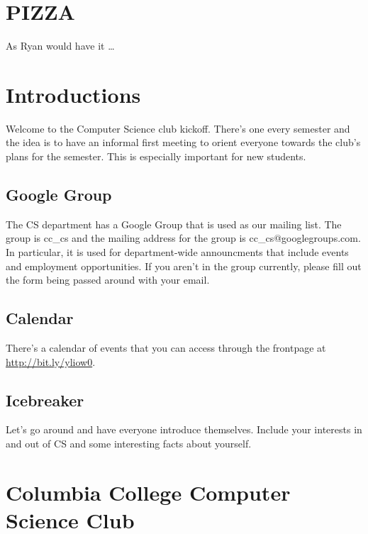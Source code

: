 

\renewcommand\TITLE{CCCS: Spring 2016 Agenda}


\topmatter


\section{PIZZA}
\label{sec-1}

As Ryan would have it \ldots{}


\newpage


\section{Introductions}
\label{sec-2}

Welcome to the Computer Science club kickoff. There's one every semester
and the idea is to have an informal first meeting to orient everyone towards
the club's plans for the semester. This is especially important for new
students.

\subsection{Google Group}
\label{sec-2-1}

The CS department has a Google Group that is used as our mailing list. The
group is cc\_cs and the mailing address for the group is cc\_cs@googlegroups.com.
In particular, it is used for department-wide announcments that include events
and employment opportunities. If you aren't in the group currently, please fill
out the form being passed around with your email.

\subsection{Calendar}
\label{sec-2-2}

There's a calendar of events that you can access through the frontpage at
\url{http://bit.ly/yliow0}.

\subsection{Icebreaker}
\label{sec-2-3}

Let's go around and have everyone introduce themselves. Include your interests
in and out of CS and some interesting facts about yourself.


\newpage


\section{Columbia College Computer Science Club}
\label{sec-3}

